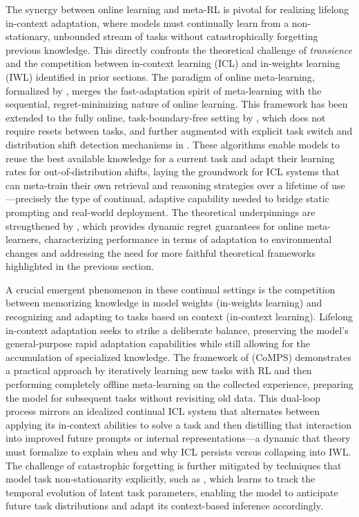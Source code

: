 \documentclass[11pt]{article}
\begin{document}
The synergy between online learning and meta-RL is pivotal for realizing lifelong in-context adaptation, where models must continually learn from a non-stationary, unbounded stream of tasks without catastrophically forgetting previous knowledge. This directly confronts the theoretical challenge of \emph{transience} and the competition between in-context learning (ICL) and in-weights learning (IWL) identified in prior sections. The paradigm of online meta-learning, formalized by \cite{ref596}, merges the fast-adaptation spirit of meta-learning with the sequential, regret-minimizing nature of online learning. This framework has been extended to the fully online, task-boundary-free setting by \cite{ref597}, which does not require resets between tasks, and further augmented with explicit task switch and distribution shift detection mechanisms in \cite{ref598}. These algorithms enable models to reuse the best available knowledge for a current task and adapt their learning rates for out-of-distribution shifts, laying the groundwork for ICL systems that can meta-train their own retrieval and reasoning strategies over a lifetime of use---precisely the type of continual, adaptive capability needed to bridge static prompting and real-world deployment. The theoretical underpinnings are strengthened by \cite{ref599}, which provides dynamic regret guarantees for online meta-learners, characterizing performance in terms of adaptation to environmental changes and addressing the need for more faithful theoretical frameworks highlighted in the previous section.

A crucial emergent phenomenon in these continual settings is the competition between memorizing knowledge in model weights (in-weights learning) and recognizing and adapting to tasks based on context (in-context learning). Lifelong in-context adaptation seeks to strike a deliberate balance, preserving the model's general-purpose rapid adaptation capabilities while still allowing for the accumulation of specialized knowledge. The framework of \cite{ref600} (CoMPS) demonstrates a practical approach by iteratively learning new tasks with RL and then performing completely offline meta-learning on the collected experience, preparing the model for subsequent tasks without revisiting old data. This dual-loop process mirrors an idealized continual ICL system that alternates between applying its in-context abilities to solve a task and then distilling that interaction into improved future prompts or internal representations---a dynamic that theory must formalize to explain when and why ICL persists versus collapsing into IWL. The challenge of catastrophic forgetting is further mitigated by techniques that model task non-stationarity explicitly, such as \cite{ref601}, which learns to track the temporal evolution of latent task parameters, enabling the model to anticipate future task distributions and adapt its context-based inference accordingly.
\end{document}
